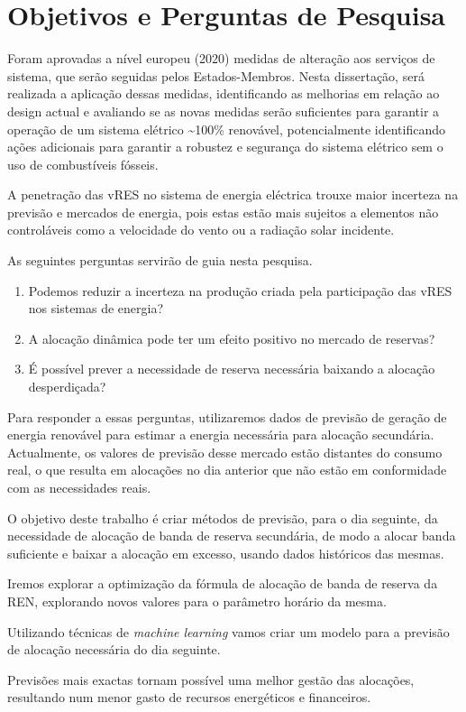 \section{Objetivos e Perguntas de Pesquisa\label{se:objetivos}}

Foram aprovadas a nível europeu (2020)\cite{52020DC0299} medidas de alteração aos serviços de sistema, que serão seguidas pelos Estados-Membros. Nesta dissertação, será realizada a aplicação dessas medidas, identificando as melhorias em relação ao design actual e avaliando se as novas medidas serão suficientes para garantir a operação de um sistema elétrico \textasciitilde100\% renovável, potencialmente identificando ações adicionais para garantir a robustez e segurança do sistema elétrico sem o uso de combustíveis fósseis.\par
A penetração das \gls{vRES} no sistema de energia eléctrica trouxe maior incerteza na previsão e mercados de energia, pois estas estão mais sujeitos a elementos não controláveis como a velocidade do vento ou a radiação solar incidente.\par
As seguintes perguntas servirão de guia nesta pesquisa.\par

\begin{enumerate}[label=\alph*)]
  \item Podemos reduzir a incerteza na produção criada pela participação das \gls{vRES} nos sistemas de energia? 
  \item A alocação dinâmica pode ter um efeito positivo no mercado de reservas?
  \item É possível prever a necessidade de reserva necessária baixando a alocação desperdiçada?
\end{enumerate}

Para responder a essas perguntas, utilizaremos dados de previsão de geração de energia renovável para estimar a energia necessária para alocação secundária. Actualmente, os valores de previsão desse mercado estão distantes do consumo real, o que resulta em alocações no dia anterior que não estão em conformidade com as necessidades reais.\par
O objetivo deste trabalho é criar métodos de previsão, para o dia seguinte, da necessidade de alocação de banda de reserva secundária, de modo a alocar banda suficiente e baixar a alocação em excesso, usando dados históricos das mesmas.\par
Iremos explorar a optimização da fórmula de alocação de banda de reserva da REN, explorando novos valores para o parâmetro horário da mesma.\par
Utilizando técnicas de \textit{machine learning} vamos criar um modelo para a previsão de alocação necessária do dia seguinte.\par
Previsões mais exactas tornam possível uma melhor gestão das alocações, resultando num menor gasto de recursos energéticos e financeiros.\par

